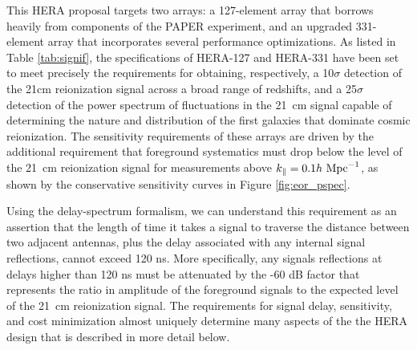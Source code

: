 \documentclass[preprint]{aastex}
\begin{document}

This HERA proposal targets two arrays: a 127-element array that borrows heavily
from components of the PAPER experiment, and an upgraded 331-element array that
incorporates several performance optimizations.  As listed in Table \ref{tab:signif}, the specifications of HERA-127
and HERA-331 have been set to meet precisely the requirements for obtaining,
respectively, a 10$\sigma$ detection of the 21cm reionization signal across a broad range of redshifts, and a
25$\sigma$ detection of the power spectrum of fluctuations in the 21~cm signal
capable of determining the nature and distribution of the first galaxies that
dominate cosmic reionization.  The sensitivity requirements of these arrays are
driven by the additional requirement that foreground systematics must
drop below the level of the 21~cm reionization signal for measurements
above $k_\parallel=0.1h\ {\rm Mpc}^{-1}$, as shown by the conservative
sensitivity curves in Figure \ref{fig:eor_pspec}.

Using the delay-spectrum formalism, we can understand this requirement as an 
assertion that the length of time it takes a signal to traverse the distance
between two adjacent antennas, plus the delay associated with any internal signal reflections, 
cannot exceed 120 ns.  More specifically, any signals reflections at delays higher
than 120 ns must be attenuated by the -60 dB factor that represents the ratio in
amplitude of the foreground signals to the expected level of the 21~cm reionization signal.
The requirements for signal delay,
sensitivity, and cost minimization almost uniquely determine many aspects of the 
the HERA design that is described in more detail below.
\end{document}
